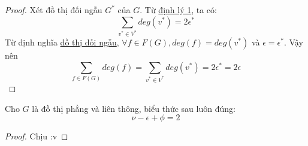 \begin{proof}
    Xét đồ thị đối ngẫu $G^*$ của $G$. Từ \hyperref[thr:v2e]{định lý 1}, ta có:
    $$\sum_{v^* \in V^*}deg(v^*) = 2\epsilon^*$$
    Từ định nghĩa \hyperref[def:dualgraph]{đồ thị đối ngẫu}, $\forall f \in F(G), deg(f)=deg(v^*)$ và $\epsilon = \epsilon^*$. Vậy nên
    $$\sum_{f \in F(G)}deg(f) = \sum_{v^* \in V^*}deg(v^*) = 2\epsilon^* = 2\epsilon$$
\end{proof}
\begin{theorem}
    Cho $G$ là đồ thị phẳng và liên thông, biểu thức sau luôn đúng: $$\nu -\epsilon+\phi=2$$
\end{theorem}
\begin{proof}
    Chịu :v
\end{proof}






